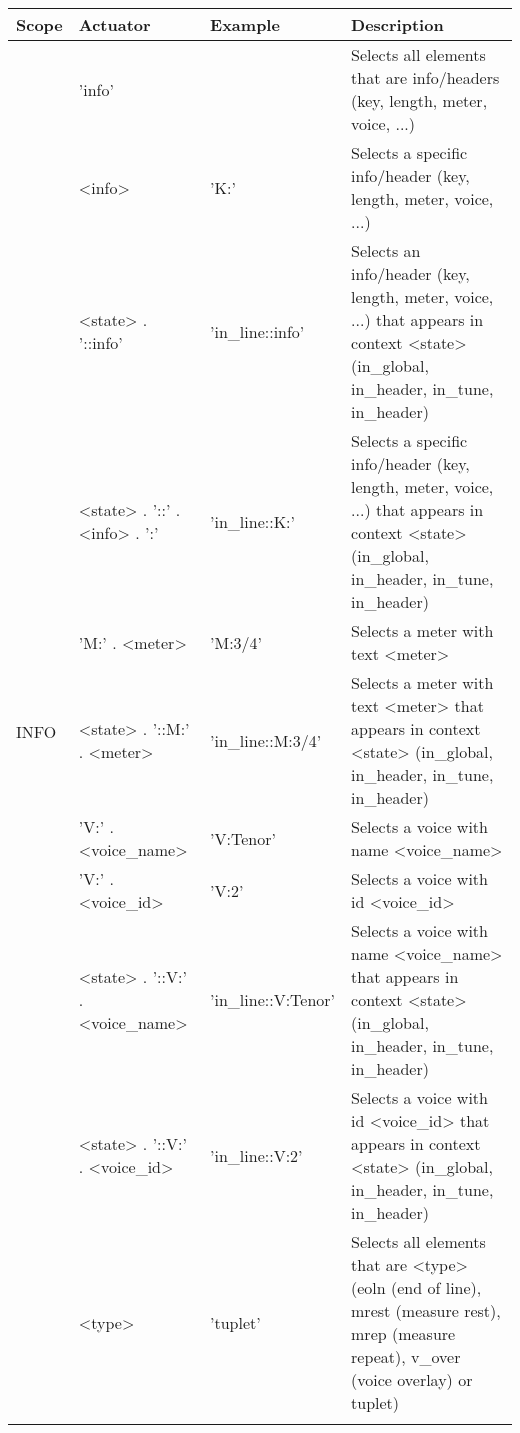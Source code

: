 \begin{center}
  \begin{tabular}{|p{1.5cm}|p{3.5cm}|p{3.25cm}|p{7cm}|}
    \hline
    Scope & Actuator & Example & Description \\
    \hline
    \hline
    \multirow{23}{*}{INFO}
    & 'info'
    &
    & Selects all \abc{} elements that are info/headers (key, length, meter, voice, ...)
    \\ \cline{2-4}

    & <info>
    & 'K:'
    & Selects a specific info/header (key, length, meter, voice, ...)
    \\ \cline{2-4}

    & <state> . '::info'
    & 'in\_line::info'
    & Selects an info/header (key, length, meter, voice, ...) that appears in context <state>
    (in\_global, in\_header, in\_tune, in\_header)
    \\ \cline{2-4}

    & <state> . '::' . <info> . ':'
    & 'in\_line::K:'
    & Selects a specific info/header (key, length, meter, voice, ...) that appears in context
    <state> (in\_global, in\_header, in\_tune, in\_header)
    \\ \cline{2-4}

    & 'M:' . <meter>
    & 'M:3/4'
    & Selects a meter with text <meter>
    \\ \cline{2-4}

    & <state> . '::M:' . <meter>
    & 'in\_line::M:3/4'
    & Selects a meter with text <meter> that appears in context <state> (in\_global, in\_header, in\_tune, in\_header)
    \\ \cline{2-4}


    & 'V:' . <voice\_name>
    & 'V:Tenor'
    & Selects a voice with name <voice\_name>
    \\ \cline{2-4}

    & 'V:' . <voice\_id>
    & 'V:2'
    & Selects a voice with id <voice\_id>
    \\ \cline{2-4}

    & <state> . '::V:' . <voice\_name>
    & 'in\_line::V:Tenor'
    & Selects a voice with name <voice\_name> that appears in context <state> (in\_global, in\_header, in\_tune, in\_header)
    \\ \cline{2-4}

    & <state> . '::V:' . <voice\_id>
    & 'in\_line::V:2'
    & Selects a voice with id <voice\_id> that appears in context <state> (in\_global, in\_header, in\_tune, in\_header)
    \\ \cline{2-4}
    \hline

    \hline
    \multirow{5}{*}{OTHER}
    & <type>
    & 'tuplet'
    & Selects all \abc{} elements that are <type> (eoln (end of line), mrest (measure rest), mrep (measure
      repeat), v\_over (voice overlay) or tuplet)
    \\ \cline{2-4}
    \hline
  \end{tabular}
\end{center}


